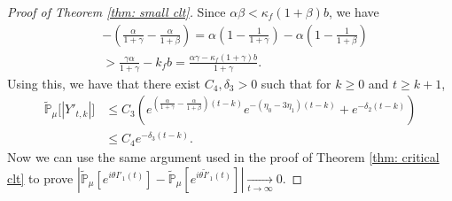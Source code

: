 \documentclass[12pt,a4paper]{amsart}
\theoremstyle{plain}
\theoremstyle{definition}
\numberwithin{equation}{section}
\begin{document}
\begin{proof}[Proof of Theorem \ref{thm: small clt}]
    Since $\alpha\beta<\kappa_f(1+\beta)b$,  we have
\begin{align}
\label{eq: condition for supercritical}
	&-(\frac{\alpha}{1+\gamma}-\frac{\alpha}{1+\beta})
    = \alpha(1-\frac{1}{1+\gamma}) - \alpha(1-\frac{1}{1+\beta})
    \\&> \frac{\gamma \alpha}{1+\gamma} - k_f b
    =\frac{\alpha \gamma-\kappa_f(1+\gamma)b}{1+\gamma}.
\end{align}
Using this, we have that there exist $C_4,
    \delta_3 > 0$ such that for $k\geq 0$ and $t\geq k+1$,
\begin{align}
    \mathbb{\tilde{P}}_{\mu}\big[|Y'_{t,k}|\big]
    & \leq C_3( e^{(\frac{\alpha}{1+\gamma} - \frac{\alpha}{1+\beta})(t-k)}e^{-(\eta_0 - 3\eta_1)(t-k)}+ e^{-\delta_2(t-k)})
    \\& \leq C_4e^{-\delta_3 (t-k)}.
\end{align}
    Now we can  use the  same argument used in the proof of Theorem \ref{thm: critical clt} to prove $|\mathbb{\tilde{P}}_{\mu}[e^{i\theta I'_1(t)}]-\mathbb{\tilde{P}}_{\mu}[e^{i\theta\tilde I'_1(t)}]|\xrightarrow[t\to \infty]{} 0$.


\end{proof}
\end{document}

